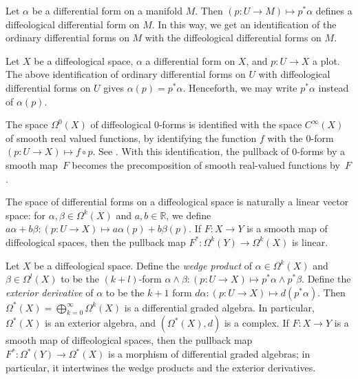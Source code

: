 \documentclass[11pt]{article}
\numberwithin{equation}{section}
\newcommand{\RR}{{\mathbb{R}}} %
\newcommand{\CIN}{{C^\infty}} %
\begin{document}
\begin{Example} \label{e:forms-on-mflds}
Let $\alpha$ be a dif\/ferential form on a manifold $M$.
Then $(p \colon U \to M) \mapsto p^* \alpha$
def\/ines a dif\/feological dif\/ferential form on $M$.
In this way, we get an identif\/ication of the ordinary dif\/ferential forms
on $M$ with the dif\/feological dif\/ferential forms on $M$.

Let $X$ be a dif\/feological space, $\alpha$ a dif\/ferential form on $X$,
and $p \colon U \to X$ a plot.
The above identif\/ication of ordinary dif\/ferential forms on $U$
with dif\/feological dif\/ferential forms on $U$
gives $\alpha(p) = p^* \alpha$.
Henceforth, we may write $p^*\alpha$ instead of $\alpha(p)$.

\end{Example}

\begin{Example} \label{e:Omega0}
The space $\Omega^0(X)$ of dif\/feological $0$-forms
is identif\/ied with the space $\CIN(X)$
of smooth real valued functions,
by identifying the function $f$
with the $0$-form $(p \colon U \to X) \mapsto f \circ p$.
See \cite[Section~6.31]{iglesias}.
With this identif\/ication, the pullback of $0$-forms by a smooth map~$F$
becomes the precomposition of smooth real-valued functions by~$F$.
\end{Example}

\begin{Remark}\label{r:linear}
The space of dif\/ferential forms on a dif\/feological space is naturally
a linear vector space:
for $\alpha,\beta \in \Omega^k(X)$ and $a,b \in \RR$,
we def\/ine $a\alpha+b\beta \colon (p \colon U \to X) \mapsto
a \alpha(p) + b \beta(p)$.
If $F \colon X \to Y$ is a smooth map of dif\/feological spaces,
then the pullback map $F^*	 \colon \Omega^k(Y) \to \Omega^k(X)$ is linear.
\end{Remark}

\begin{Remark}
\label{alg iso}
Let $X$ be a dif\/feological space.
Def\/ine the \emph{wedge product}
of $ \alpha \in \Omega^k(X) $ and $ \beta \in \Omega^l(X) $
to be the $(k+l)$-form
$\alpha \wedge \beta \colon (p \colon U \to X)
 \mapsto p^* \alpha \wedge p^* \beta$.
Def\/ine the \emph{exterior derivative} of $\alpha$
to be the $k+1$ form
$d\alpha \colon (p \colon U \to X) \mapsto d (p^*\alpha)$.
Then $\Omega^*(X)=\bigoplus_{k=0}^\infty\Omega^k(X)$
is a dif\/ferential graded algebra.
In particular, $\Omega^*(X)$ is an exterior algebra,
and $(\Omega^*(X),d)$ is a complex.
If $F \colon X \to Y$ is a smooth map of dif\/feological spaces,
then the pullback map $F^* \colon \Omega^*(Y) \to \Omega^*(X)$
is a morphism of dif\/ferential graded algebras;
in particular,
it intertwines the wedge products and the exterior derivatives.
\end{Remark}
\end{document}
